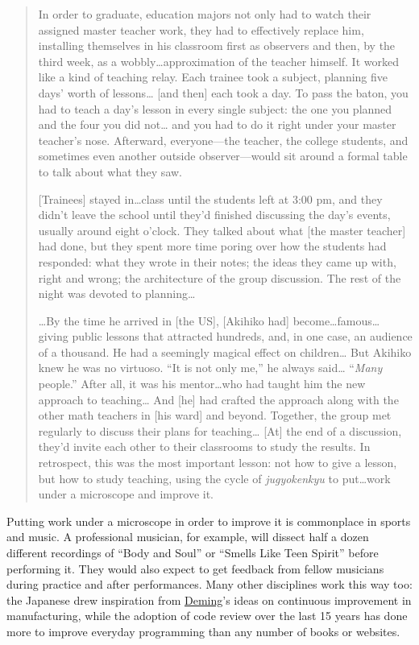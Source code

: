 \begin{quote}
In order to graduate, education majors not only had to watch their
assigned master teacher work, they had to effectively replace him,
installing themselves in his classroom first as observers and then, by
the third week, as a wobbly\ldots{}approximation of the teacher himself.
It worked like a kind of teaching relay. Each trainee took a subject,
planning five days' worth of lessons\ldots{} {[}and then{]} each took a
day. To pass the baton, you had to teach a day's lesson in every single
subject: the one you planned and the four you did not\ldots{} and you
had to do it right under your master teacher's nose. Afterward,
everyone---the teacher, the college students, and sometimes even another
outside observer---would sit around a formal table to talk about what
they saw.

{[}Trainees{]} stayed in\ldots{}class until the students left at 3:00
pm, and they didn't leave the school until they'd finished discussing
the day's events, usually around eight o'clock. They talked about what
{[}the master teacher{]} had done, but they spent more time poring over
how the students had responded: what they wrote in their notes; the
ideas they came up with, right and wrong; the architecture of the group
discussion. The rest of the night was devoted to planning\ldots{}

\ldots{}By the time he arrived in {[}the US{]}, {[}Akihiko had{]}
become\ldots{}famous\ldots{} giving public lessons that attracted
hundreds, and, in one case, an audience of a thousand. He had a
seemingly magical effect on children\ldots{} But Akihiko knew he was no
virtuoso. ``It is not only me,'' he always said\ldots{} ``\emph{Many}
people.'' After all, it was his mentor\ldots{}who had taught him the new
approach to teaching\ldots{} And {[}he{]} had crafted the approach along
with the other math teachers in {[}his ward{]} and beyond. Together, the
group met regularly to discuss their plans for teaching\ldots{} {[}At{]}
the end of a discussion, they'd invite each other to their classrooms to
study the results. In retrospect, this was the most important lesson:
not how to give a lesson, but how to study teaching, using the cycle of
\emph{jugyokenkyu} to put\ldots{}work under a microscope and improve it.
\end{quote}

Putting work under a microscope in order to improve it is commonplace in
sports and music. A professional musician, for example, will dissect
half a dozen different recordings of ``Body and Soul'' or ``Smells Like
Teen Spirit'' before performing it. They would also expect to get
feedback from fellow musicians during practice and after performances.
Many other disciplines work this way too: the Japanese drew inspiration
from \href{https://en.wikipedia.org/wiki/W.\_Edwards\_Deming}{Deming}'s
ideas on continuous improvement in manufacturing, while the adoption of
code review over the last 15 years has done more to improve everyday
programming than any number of books or websites.

